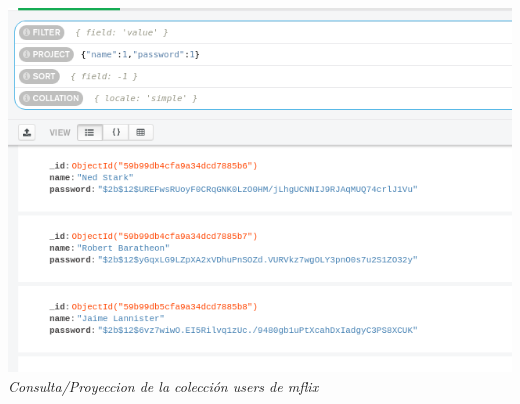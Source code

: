 \documentclass[10pt]{article}
\begin{document}
\begin{center}
  \includegraphics[scale=0.35]{imgs/e1_3.png}\\
  \textit{Consulta/Proyeccion de la colección users de mflix}
\end{center}
\end{document}
